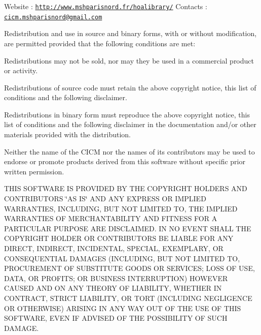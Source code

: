 Website \-: \href{http://www.mshparisnord.fr/hoalibrary/}{\tt http\-://www.\-mshparisnord.\-fr/hoalibrary/} Contacts \-: \href{mailto:cicm.mshparisnord@gmail.com}{\tt cicm.\-mshparisnord@gmail.\-com}

Redistribution and use in source and binary forms, with or without modification, are permitted provided that the following conditions are met\-:


\begin{DoxyItemize}
\item Redistributions may not be sold, nor may they be used in a commercial product or activity.
\item Redistributions of source code must retain the above copyright notice, this list of conditions and the following disclaimer.
\item Redistributions in binary form must reproduce the above copyright notice, this list of conditions and the following disclaimer in the documentation and/or other materials provided with the distribution.
\item Neither the name of the C\-I\-C\-M nor the names of its contributors may be used to endorse or promote products derived from this software without specific prior written permission.
\end{DoxyItemize}

T\-H\-I\-S S\-O\-F\-T\-W\-A\-R\-E I\-S P\-R\-O\-V\-I\-D\-E\-D B\-Y T\-H\-E C\-O\-P\-Y\-R\-I\-G\-H\-T H\-O\-L\-D\-E\-R\-S A\-N\-D C\-O\-N\-T\-R\-I\-B\-U\-T\-O\-R\-S \char`\"{}\-A\-S I\-S\char`\"{} A\-N\-D A\-N\-Y E\-X\-P\-R\-E\-S\-S O\-R I\-M\-P\-L\-I\-E\-D W\-A\-R\-R\-A\-N\-T\-I\-E\-S, I\-N\-C\-L\-U\-D\-I\-N\-G, B\-U\-T N\-O\-T L\-I\-M\-I\-T\-E\-D T\-O, T\-H\-E I\-M\-P\-L\-I\-E\-D W\-A\-R\-R\-A\-N\-T\-I\-E\-S O\-F M\-E\-R\-C\-H\-A\-N\-T\-A\-B\-I\-L\-I\-T\-Y A\-N\-D F\-I\-T\-N\-E\-S\-S F\-O\-R A P\-A\-R\-T\-I\-C\-U\-L\-A\-R P\-U\-R\-P\-O\-S\-E A\-R\-E D\-I\-S\-C\-L\-A\-I\-M\-E\-D. I\-N N\-O E\-V\-E\-N\-T S\-H\-A\-L\-L T\-H\-E C\-O\-P\-Y\-R\-I\-G\-H\-T H\-O\-L\-D\-E\-R O\-R C\-O\-N\-T\-R\-I\-B\-U\-T\-O\-R\-S B\-E L\-I\-A\-B\-L\-E F\-O\-R A\-N\-Y D\-I\-R\-E\-C\-T, I\-N\-D\-I\-R\-E\-C\-T, I\-N\-C\-I\-D\-E\-N\-T\-A\-L, S\-P\-E\-C\-I\-A\-L, E\-X\-E\-M\-P\-L\-A\-R\-Y, O\-R C\-O\-N\-S\-E\-Q\-U\-E\-N\-T\-I\-A\-L D\-A\-M\-A\-G\-E\-S (I\-N\-C\-L\-U\-D\-I\-N\-G, B\-U\-T N\-O\-T L\-I\-M\-I\-T\-E\-D T\-O, P\-R\-O\-C\-U\-R\-E\-M\-E\-N\-T O\-F S\-U\-B\-S\-T\-I\-T\-U\-T\-E G\-O\-O\-D\-S O\-R S\-E\-R\-V\-I\-C\-E\-S; L\-O\-S\-S O\-F U\-S\-E, D\-A\-T\-A, O\-R P\-R\-O\-F\-I\-T\-S; O\-R B\-U\-S\-I\-N\-E\-S\-S I\-N\-T\-E\-R\-R\-U\-P\-T\-I\-O\-N) H\-O\-W\-E\-V\-E\-R C\-A\-U\-S\-E\-D A\-N\-D O\-N A\-N\-Y T\-H\-E\-O\-R\-Y O\-F L\-I\-A\-B\-I\-L\-I\-T\-Y, W\-H\-E\-T\-H\-E\-R I\-N C\-O\-N\-T\-R\-A\-C\-T, S\-T\-R\-I\-C\-T L\-I\-A\-B\-I\-L\-I\-T\-Y, O\-R T\-O\-R\-T (I\-N\-C\-L\-U\-D\-I\-N\-G N\-E\-G\-L\-I\-G\-E\-N\-C\-E O\-R O\-T\-H\-E\-R\-W\-I\-S\-E) A\-R\-I\-S\-I\-N\-G I\-N A\-N\-Y W\-A\-Y O\-U\-T O\-F T\-H\-E U\-S\-E O\-F T\-H\-I\-S S\-O\-F\-T\-W\-A\-R\-E, E\-V\-E\-N I\-F A\-D\-V\-I\-S\-E\-D O\-F T\-H\-E P\-O\-S\-S\-I\-B\-I\-L\-I\-T\-Y O\-F S\-U\-C\-H D\-A\-M\-A\-G\-E. 

